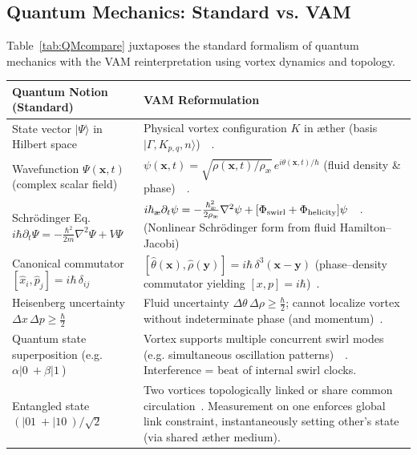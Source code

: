 \documentclass[preprint]{revtex4-2}
\begin{document}
    \subsection{Quantum Mechanics: Standard vs. VAM}
    Table~\ref{tab:QMcompare} juxtaposes the standard formalism of quantum mechanics with the VAM reinterpretation using vortex dynamics and topology.

    \begin{table}[H]
        \centering
        \scriptsize
        \begin{tabular}{p{} | p{}}
            \hline
            \textbf{Quantum Notion (Standard)} & \textbf{VAM Reformulation} \\
            \hline
            State vector $|\Psi\rangle$ in Hilbert space & Physical vortex configuration $K$ in æther (basis $|\Gamma, K_{p,q}, n\rangle$)~\cite{reference_179}~\cite{reference_180}. \\
            Wavefunction $\Psi(\mathbf{x},t)$ (complex scalar field) & $\psi(\mathbf{x},t) = \sqrt{\rho(\mathbf{x},t)/\rho_{\text{\ae}}}\,e^{i\theta(\mathbf{x},t)/\hbar}$ (fluid density \& phase)~\cite{reference_181}~\cite{reference_182}. \\
            Schrödinger Eq. $i\hbar\partial_t\Psi = -\frac{\hbar^2}{2m}\nabla^2\Psi + V\Psi$ & $i\hbar_{\text{\ae}}\partial_t\psi = -\frac{\hbar_{\text{\ae}}^2}{2\rho_{\text{\ae}}}\nabla^2\psi + [\Phi_{\rm swirl}+\Phi_{\rm helicity}]\psi$~\cite{reference_183}~\cite{reference_184}. (Nonlinear Schrödinger form from fluid Hamilton–Jacobi) \\
            Canonical commutator $[ \hat{x}_i, \hat{p}_j ] = i\hbar\,\delta_{ij}$ & $[\hat{\theta}(\mathbf{x}), \hat{\rho}(\mathbf{y})] = i\hbar\,\delta^3(\mathbf{x}-\mathbf{y})$ (phase–density commutator yielding $[x,p]=i\hbar$)~\cite{reference_185}. \\
            Heisenberg uncertainty $\Delta x\,\Delta p \ge \frac{\hbar}{2}$ & Fluid uncertainty $\Delta \theta\,\Delta \rho \ge \frac{\hbar}{2}$; cannot localize vortex without indeterminate phase (and momentum)~\cite{reference_186}. \\
            Quantum state superposition (e.g. $\alpha|0\>+\beta|1\>$) & Vortex supports multiple concurrent swirl modes (e.g. simultaneous oscillation patterns)~\cite{reference_187}~\cite{reference_188}. Interference = beat of internal swirl clocks. \\
            Entangled state $(|01\>+|10\>)/\sqrt{2}$ & Two vortices topologically linked or share common circulation~\cite{reference_189}. Measurement on one enforces global link constraint, instantaneously setting other’s state (via shared æther medium). \\

\end{tabular}
\end{table}
\end{document}
